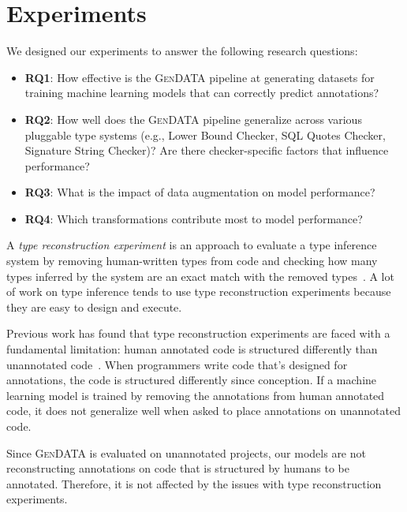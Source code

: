 \documentclass[acmsmall,screen,review,anonymous]{acmart}
\newcommand{\gendata}{\textsc{GenDATA}\xspace}
\begin{document}
\section{Experiments}
\label{sec:experiments}

We designed our experiments to answer the following research questions:

\begin{itemize}
    \item \textbf{RQ1}: How effective is the \gendata pipeline at generating datasets for training machine learning models that can correctly predict annotations?
    
    \item \textbf{RQ2}: How well does the \gendata pipeline generalize across various pluggable type systems (e.g., Lower Bound Checker, SQL Quotes Checker, Signature String Checker)? Are there checker-specific factors that influence performance?
    
    \item \textbf{RQ3}: What is the impact of data augmentation on model performance?
    
    \item \textbf{RQ4}: Which transformations contribute most to model performance?
\end{itemize}

A \emph{type reconstruction experiment} is an approach to evaluate a type inference system by removing human-written types from code and checking how many types inferred by the system are an exact match with the removed types~\cite{karimipour2025new}. A lot of work on type inference tends to use type reconstruction experiments because they are easy to design and execute.

Previous work has found that type reconstruction experiments are faced with a fundamental limitation: human annotated code is structured differently than unannotated code~\cite{karimipour2025new}. When programmers write code that's designed for annotations, the code is structured differently since conception. If a machine learning model is trained by removing the annotations from human annotated code, it does not generalize well when asked to place annotations on unannotated code.

Since \gendata is evaluated on unannotated projects, our models are not reconstructing annotations on code that is structured by humans to be annotated. Therefore, it is not affected by the issues with type reconstruction experiments.
\end{document}
